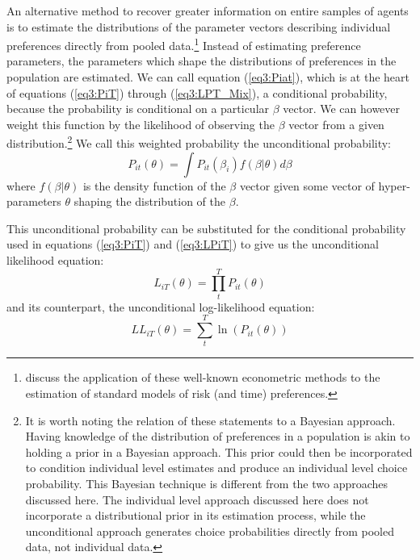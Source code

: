 \documentclass[../main.tex]{subfiles}
\begin{document}
An alternative method to recover greater information on entire samples of agents is to estimate the distributions of the parameter vectors describing individual preferences directly from pooled data.\footnote{
	\textcite{Andersen2012} discuss the application of these well-known econometric methods to the estimation of standard models of risk (and time) preferences.
}
Instead of estimating preference parameters, the parameters which shape the distributions of preferences in the population are estimated.
We can call equation (\ref{eq3:Piat}), which is at the heart of equations (\ref{eq3:PiT}) through (\ref{eq3:LPT_Mix}), a conditional probability, because the probability is conditional on a particular $\beta$ vector.
We can however weight this function by the likelihood of observing the $\beta$ vector from a given distribution.\footnote{
	It is worth noting the relation of these statements to a Bayesian approach.
	Having knowledge of the distribution of preferences in a population is akin to holding a prior in a Bayesian approach.
	This prior could then be incorporated to condition individual level estimates and produce an individual level choice probability.
	This Bayesian technique is different from the two approaches discussed here.
	The individual level approach discussed here does not incorporate a distributional prior in its estimation process, while the unconditional approach generates choice probabilities directly from pooled data, not individual data.
}
We call this weighted probability the unconditional probability:
\begin{equation}
	\label{eq3:Pit}
	P_{it}(\theta) = \int P_{it}(\beta_i) f(\beta | \theta) d\beta
\end{equation}
\noindent where $f(\beta|\theta)$ is the density function of the $\beta$ vector given some vector of hyper-parameters $\theta$ shaping the distribution of the $\beta$.

This unconditional probability can be substituted for the conditional probability used in equations (\ref{eq3:PiT}) and (\ref{eq3:LPiT}) to give us the unconditional likelihood equation:
\begin{equation}
	\label{eq3:LiT}
	L_{iT}(\theta) = \prod_t^T P_{it}(\theta)
\end{equation}
\noindent and its counterpart, the unconditional log-likelihood equation:
\begin{equation}
	\label{eq3:LLiT}
	\mathit{LL}_{iT}(\theta) = \sum_t^T \ln \left( P_{it}(\theta) \right)
\end{equation}
\end{document}
